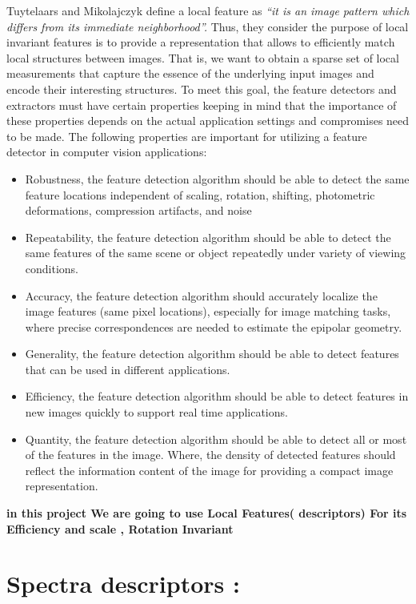 Tuytelaars and Mikolajczyk \cite{MM} define a local feature as \textit{ “it is an image pattern
which differs from its immediate neighborhood”.} Thus, they consider the purpose of
local invariant features is to provide a representation that allows to efficiently match
local structures between images. That is, we want to obtain a sparse set of local
measurements that capture the essence of the underlying input images and encode
their interesting structures. To meet this goal, the feature detectors and extractors
must have certain properties keeping in mind that the importance of these properties
depends on the actual application settings and compromises need to be made. The
following properties are important for utilizing a feature detector in computer vision
applications:
\begin{itemize}
\item Robustness, the feature detection algorithm should be able to detect the same feature
locations independent of scaling, rotation, shifting, photometric deformations,
compression artifacts, and noise
\item Repeatability, the feature detection algorithm should be able to detect the same
features of the same scene or object repeatedly under variety of viewing conditions.
\item Accuracy, the feature detection algorithm should accurately localize the image
features (same pixel locations), especially for image matching tasks, where precise
correspondences are needed to estimate the epipolar geometry.
\item Generality, the feature detection algorithm should be able to detect features that
can be used in different applications.
\item Efficiency, the feature detection algorithm should be able to detect features in new
images quickly to support real time applications.
\item Quantity, the feature detection algorithm should be able to detect all or most of the
features in the image. Where, the density of detected features should reflect the
information content of the image for providing a compact image representation.
\end{itemize}

\textbf{in this project We are going to use Local Features( descriptors) For its Efficiency and scale , Rotation  Invariant }\\
\section{Spectra descriptors :}
